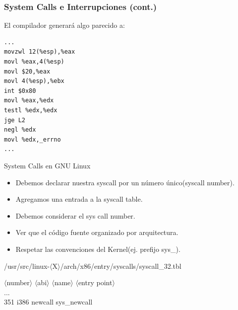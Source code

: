 \begin{frame}[fragile]
\frametitle{System Calls e Interrupciones (cont.)}
El compilador generará algo parecido a:
\begin{lstlisting}
...
movzwl 12(%esp),%eax
movl %eax,4(%esp)
movl $20,%eax
movl 4(%esp),%ebx
int $0x80
movl %eax,%edx
testl %edx,%edx
jge L2
negl %edx
movl %edx,_errno
...
\end{lstlisting}
\end{frame}

\begin{frame}{System Calls en GNU Linux}
   \begin{itemize}  
   \item Debemos declarar nuestra syscall por un número único(syscall number). 
   \item Agregamos una entrada a la syscall table.
   \item Debemos considerar el sys call number.
   \item Ver que el código fuente organizado por arquitectura.
   \item Respetar las convenciones del Kernel(ej. prefijo sys\_).
 \end{itemize}

\begin{block}{/usr/src/linux-$\langle$X$\rangle$/arch/x86/entry/syscalls/syscall\_32.tbl}
  \begin{block}{}
     $\langle$number$\rangle$ $\langle$abi$\rangle$ $\langle$name$\rangle$ $\langle$entry point$\rangle$ \\
     ... \\
     \alert{351   i386  newcall   sys\_newcall} \\ 
  \end{block}

\end{block}

\end{frame}


